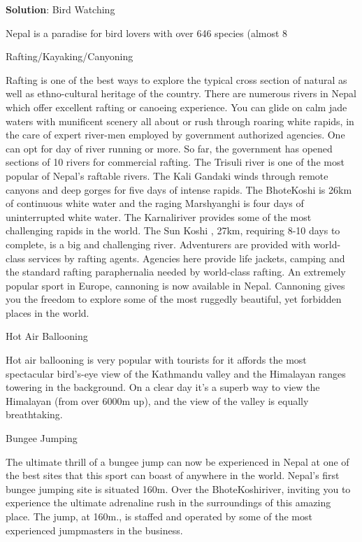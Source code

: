 \documentclass[
]{book}
\newenvironment{solution}{ {\bfseries Solution}:}{}
\begin{document}
\begin{questions}
\begin{solution}
Bird Watching

Nepal is a paradise for bird lovers with over 646 species (almost 8%

Rafting/Kayaking/Canyoning

Rafting  is one of the best ways to explore the typical cross section of natural as well as ethno-cultural heritage of the country. There are numerous rivers in Nepal which offer excellent rafting or canoeing experience. You can glide on calm jade waters with munificent scenery all about or rush through roaring white rapids, in the care of expert river-men employed by government authorized agencies. One can opt for day of river running or more. So far, the government has opened sections of 10 rivers for commercial rafting. The Trisuli river  is one of the most popular of Nepal’s raftable rivers. The Kali Gandaki winds through remote canyons and deep gorges for five days of intense rapids. The BhoteKoshi is 26km of continuous white water and the raging Marshyanghi is four days of uninterrupted white water. The Karnaliriver provides some of the most challenging rapids in the world. The Sun Koshi , 27km, requiring 8-10 days to complete, is a big and challenging river. Adventurers are provided with world-class services by rafting agents. Agencies here provide life jackets, camping and the standard rafting paraphernalia needed by world-class rafting. An extremely popular sport in Europe, cannoning is now available in Nepal. Cannoning gives you the freedom to explore some of the most ruggedly beautiful, yet forbidden places in the world.

Hot Air Ballooning

Hot air ballooning is very popular with tourists for it affords the most spectacular bird's-eye view of the Kathmandu valley and the Himalayan ranges towering in the background. On a clear day it's a superb way to view the Himalayan (from over 6000m up), and the view of the valley is equally breathtaking.

Bungee Jumping

The ultimate thrill of a bungee jump can now be experienced in Nepal at one of the best sites that this sport can boast of anywhere in the world. Nepal's first bungee jumping site is situated 160m. Over the BhoteKoshiriver, inviting you to experience the ultimate adrenaline rush in the surroundings of this amazing place. The jump, at 160m., is staffed and operated by some of the most experienced jumpmasters in the business.


\end{solution}
\end{questions}
\end{document}
